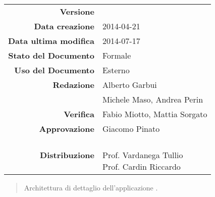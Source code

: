


\newcommand{\Versione}{\versioneDefinizioneDiProdotto{}} %
\newcommand{\Data}{2014-04-21}				           	 %
\newcommand{\DataUltimaModifica}{2014-07-17}
\newcommand{\TipoDocumento}{Definizione di Prodotto}	 %



\begin{center}
\begin{tabular}{r|l}
\textbf{Versione} & \Versione{} \\
\textbf{Data creazione} & \Data{} \\
\textbf{Data ultima modifica} & \DataUltimaModifica{} \\
\textbf{Stato del Documento} & Formale \\		          %
\textbf{Uso del Documento} & Esterno \\			          %
\textbf{Redazione} & Alberto Garbui\\	  %
& Michele Maso, Andrea Perin\\
\textbf{Verifica} & Fabio Miotto, Mattia Sorgato\\  %
\textbf{Approvazione} & Giacomo Pinato\\				      %
\textbf{Distribuzione} & \parbox[t]{4cm}{\NomeGruppo{}\\Prof. Vardanega Tullio\\Prof. Cardin Riccardo\\ \Prop{} }\\
\end{tabular}
\end{center}

\vspace{0.05in}

\begin{abstract}
\begin{center}
Architettura di dettaglio dell'applicazione \Progetto{}.
\end{center}
\end{abstract}

